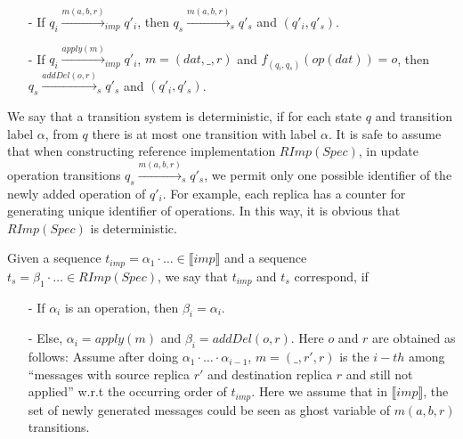 {{\begin{itemize}
    \begin{itemize}
    \setlength{\itemsep}{0.5pt}
    \item[-] $\forall r \in RId$, $\vert MsgToOp(q_i)(r) \vert = \vert AOpS(q_s)(r) \vert$.

    \item[-] There is a function $f_{(q_i,q_s)}$ that maps the $i-th$ op of $MsgToOp(q_i)(r)$ w.r.t $<_{roi}$ into the $i-th$ op of $AOpS(q_s)(r)$ w.r.t $ro$ for each $i$. Moreover, $o_1 = OpMsgI(q_i)(r_1)$, $o_2 = OpMsgI(q_i)(r_2)$, $r_1 \neq r_2$, and $o_1$ and $o_2$ are mapped from same $dat$, if and only if $f_{(q_i,q_s)}(o_1)=f_{(q_i,q_s)}(o_2)$. We can see that such $f_{(q_i,q_s)}$ is unique if it exists.
    \end{itemize}

\item[-] If $q_i {\xrightarrow{m(a,b,r)}}_{imp} q'_i$, then $q_s {\xrightarrow{m(a,b,r)}}_s q'_s$ and $(q'_i,q'_s)$.

\item[-] If $q_i {\xrightarrow{apply(m)}}_{imp} q'_i$, $m=(dat,\_,r)$ and $f_{(q_i,q_s)}(op(dat))=o$, then $q_s {\xrightarrow{addDel(o,r)}}_s q'_s$ and $(q'_i,q'_s)$.
\end{itemize}

}




We say that a transition system is deterministic, if for each state $q$ and transition label $\alpha$, from $q$ there is at most one transition with label $\alpha$. {\color {red}It is safe to assume that when constructing reference implementation $RImp(Spec)$, in update operation transitions $q_s {\xrightarrow{m(a,b,r)}}_s q'_s$, we permit only one possible identifier of the newly added operation of $q'_i$. For example, each replica has a counter for generating unique identifier of operations. In this way, it is obvious that $RImp(Spec)$ is deterministic.}

Given a sequence $t_{imp} = \alpha_1 \cdot \ldots \in \llbracket imp \rrbracket$ and a sequence $t_s = \beta_1 \cdot \ldots \in RImp(Spec)$, we say that $t_{imp}$ and $t_s$ correspond, if

\begin{itemize}
\setlength{\itemsep}{0.5pt}
\item[-] If $\alpha_i$ is an operation, then $\beta_i = \alpha_i$.

\item[-] Else, $\alpha_i = apply(m)$ and $\beta_i = addDel(o,r)$. Here $o$ and $r$ are obtained as follows: Assume after doing $\alpha_1 \cdot \ldots \cdot \alpha_{i-1}$, $m=(\_,r',r)$ is the $i-th$ among ``messages with source replica $r'$ and destination replica $r$ and still not applied'' w.r.t the occurring order of $t_{imp}$. {\color {red}Here we assume that in $\llbracket imp \rrbracket$, the set of newly generated messages could be seen as ghost variable of $m(a,b,r)$ transitions.}


\end{itemize}}
